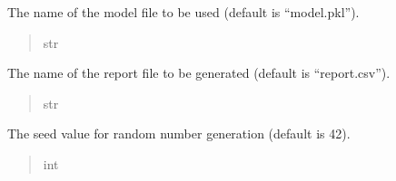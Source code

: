 \documentclass[letterpaper,10pt,english]{sphinxmanual}
\begin{document}
\begin{fulllineitems}
\begin{fulllineitems}
\label{\detokenize{domain.interfaces:domain.interfaces.AlgorithmConfigurator.AlgorithmConfigurator.model_name}}
\pysigstartsignatures
{}
\pysigstopsignatures
\sphinxAtStartPar
The name of the model file to be used (default is “model.pkl”).
\begin{quote}\begin{description}
\sphinxAtStartPar
str

\end{description}\end{quote}

\end{fulllineitems}


\begin{fulllineitems}
\label{\detokenize{domain.interfaces:domain.interfaces.AlgorithmConfigurator.AlgorithmConfigurator.report_file}}
\pysigstartsignatures
{}
\pysigstopsignatures
\sphinxAtStartPar
The name of the report file to be generated (default is “report.csv”).
\begin{quote}\begin{description}
\sphinxAtStartPar
str

\end{description}\end{quote}

\end{fulllineitems}


\begin{fulllineitems}
\label{\detokenize{domain.interfaces:domain.interfaces.AlgorithmConfigurator.AlgorithmConfigurator.seed}}
\pysigstartsignatures
{}
\pysigstopsignatures
\sphinxAtStartPar
The seed value for random number generation (default is 42).
\begin{quote}\begin{description}
\sphinxAtStartPar
int


\end{description}
\end{quote}
\end{fulllineitems}
\end{fulllineitems}
\end{document}

